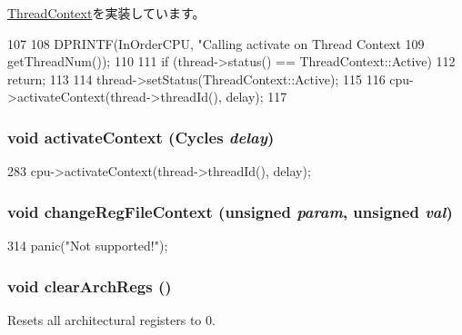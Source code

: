 \hyperlink{classThreadContext_a9270160e6cce25ded6999f6e4e60a3ed}{ThreadContext}を実装しています。


\begin{DoxyCode}
107 {
108     DPRINTF(InOrderCPU, "Calling activate on Thread Context %
109             getThreadNum());
110 
111     if (thread->status() == ThreadContext::Active)
112         return;
113 
114     thread->setStatus(ThreadContext::Active);
115 
116     cpu->activateContext(thread->threadId(), delay);
117 }
\end{DoxyCode}
\hypertarget{classInOrderThreadContext_a4f6e340045c7344d26acbb6fbece544e}{
\subsubsection[{activateContext}]{\setlength{\rightskip}{0pt plus 5cm}void activateContext ({\bf Cycles} {\em delay})}}
\label{classInOrderThreadContext_a4f6e340045c7344d26acbb6fbece544e}



\begin{DoxyCode}
283     { cpu->activateContext(thread->threadId(), delay); }
\end{DoxyCode}
\hypertarget{classInOrderThreadContext_a3f71438128bca2ddd412462483bf0f70}{
\subsubsection[{changeRegFileContext}]{\setlength{\rightskip}{0pt plus 5cm}void changeRegFileContext (unsigned {\em param}, \/  unsigned {\em val})}}
\label{classInOrderThreadContext_a3f71438128bca2ddd412462483bf0f70}



\begin{DoxyCode}
314     { panic("Not supported!"); }
\end{DoxyCode}
\hypertarget{classInOrderThreadContext_ad5c88ea41846742bd8c70d9c50f31945}{
\subsubsection[{clearArchRegs}]{\setlength{\rightskip}{0pt plus 5cm}void clearArchRegs ()}}
\label{classInOrderThreadContext_ad5c88ea41846742bd8c70d9c50f31945}
Resets all architectural registers to 0. 


